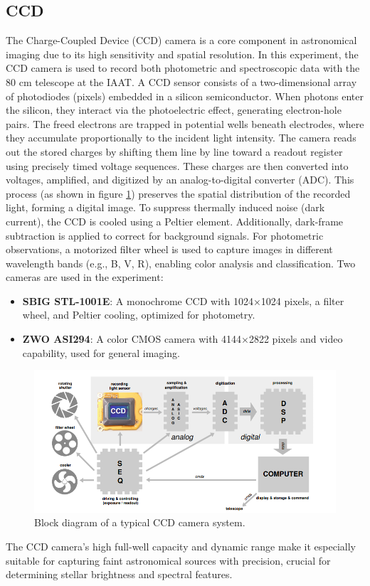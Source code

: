 \documentclass[12pt,a4paper]{article}
\begin{document}
  \subsection{CCD} 
  \label{sec:ccd}
  The Charge-Coupled Device (CCD) camera is a core component in astronomical imaging due to its high sensitivity and spatial resolution. In this experiment, the CCD camera is used to record both photometric and spectroscopic data with the 80 cm telescope at the IAAT.
  A CCD sensor consists of a two-dimensional array of photodiodes (pixels) embedded in a silicon semiconductor. When photons enter the silicon, they interact via the photoelectric effect, generating electron-hole pairs. The freed electrons are trapped in potential wells beneath electrodes, where they accumulate proportionally to the incident light intensity.
  The camera reads out the stored charges by shifting them line by line toward a readout register using precisely timed voltage sequences. These charges are then converted into voltages, amplified, and digitized by an analog-to-digital converter (ADC). This process (as shown in figure \ref{fig:CCD_block}) preserves the spatial distribution of the recorded light, forming a digital image.
  To suppress thermally induced noise (dark current), the CCD is cooled using a Peltier element. Additionally, dark-frame subtraction is applied to correct for background signals. For photometric observations, a motorized filter wheel is used to capture images in different wavelength bands (e.g., B, V, R), enabling color analysis and classification.
  Two cameras are used in the experiment:
  \begin{itemize}
    \item \textbf{SBIG STL-1001E}: A monochrome CCD with 1024×1024 pixels, a filter wheel, and Peltier cooling, optimized for photometry.
    \item \textbf{ZWO ASI294}: A color CMOS camera with 4144×2822 pixels and video capability, used for general imaging.
  \end{itemize}
  \begin{figure}[H]
    \centering
    \includegraphics[width=1.0\textwidth]{Pictures/CCD.png}
    \caption{Block diagram of a typical CCD camera system.}
    \label{fig:CCD_block}
  \end{figure}
  The CCD camera's high full-well capacity and dynamic range make it especially suitable for capturing faint astronomical sources with precision, crucial for determining stellar brightness and spectral features.
 
\end{document}

